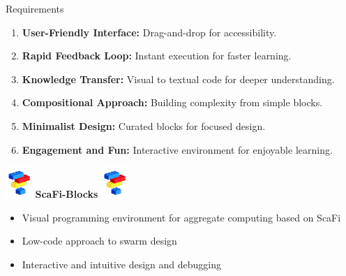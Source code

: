 \documentclass[aspectratio=169]{beamer}
\begin{document}
\begin{frame}{Requirements}
	\begin{enumerate}
    \item \textbf{User-Friendly Interface:} Drag-and-drop for accessibility.
    \item \textbf{Rapid Feedback Loop:} Instant execution for faster learning.
    \item \textbf{Knowledge Transfer:} Visual to textual code for deeper understanding.
    \item \textbf{Compositional Approach:} Building complexity from simple blocks.
    \item \textbf{Minimalist Design:} Curated blocks for focused design.
    \item \textbf{Engagement and Fun:} Interactive environment for enjoyable learning.
\end{enumerate}

\end{frame}
\begin{frame}[standout]
	\includegraphics[width=1cm]{img/scafiblocks-logo.png}
	\Huge{\textbf{ScaFi-Blocks}}
	\includegraphics[width=1cm]{img/scafiblocks-logo.png}
	\Large{
		\begin{itemize}
			\item \alert{Visual programming environment} for aggregate computing based on ScaFi
			\item \alert{Low-code} approach to swarm design
			\item \alert{Interactive} and \alert{intuitive} design and debugging
		\end{itemize}}
\end{frame}
\end{document}
